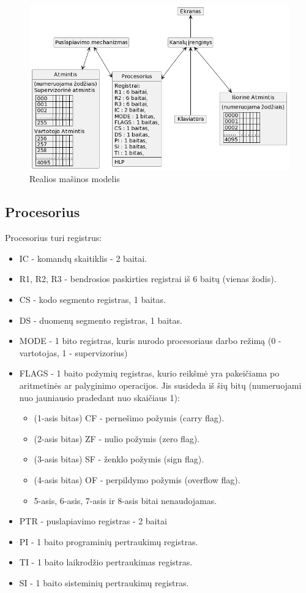 \documentclass{VUMIFInfKursinis}
\begin{document}
\begin{figure}[H]
	\centering	
	\includegraphics[scale=0.65]{img/reali_masina}
	\caption{Realios mašinos modelis}   %
	\label{img:reali_masina}
\end{figure}

\subsection{Procesorius}

Procesorius turi registrus:

\begin{itemize}
	\item IC - komandų skaitiklis - 2 baitai.
	\item R1, R2, R3 - bendrosios paskirties registrai iš 6 baitų (vienas žodis).
	\item CS - kodo segmento registras, 1 baitas.
	\item DS - duomenų segmento registras, 1 baitas.
	\item MODE - 1 bito registras, kuris nurodo procesoriaus darbo režimą (0 - vartotojas, 1 - supervizorius)
	\item FLAGS - 1 baito požymių registras, kurio reikšmė yra pakeičiama po aritmetinės ar palyginimo operacijos. Jis susideda iš šių bitų (numeruojami nuo jauniausio pradedant nuo skaičiaus 1): 
	\begin{itemize}
		\item (1-asis bitas) CF - pernešimo požymis (carry flag).
		\item (2-asis bitas) ZF - nulio požymis (zero flag).
		\item (3-asis bitas) SF - ženklo požymis (sign flag).
		\item (4-asis bitas) OF - perpildymo požymis (overflow flag).
		\item 5-asis, 6-asis, 7-asis ir 8-asis bitai nenaudojamas.
	\end{itemize}
	\item PTR - puslapiavimo registras - 2 baitai
	\item PI - 1 baito programinių pertraukimų registras.
	\item TI - 1 baito laikrodžio pertraukimas registras.
	\item SI - 1 baito sisteminių pertraukimų registras.
\end{itemize}
\end{document}
